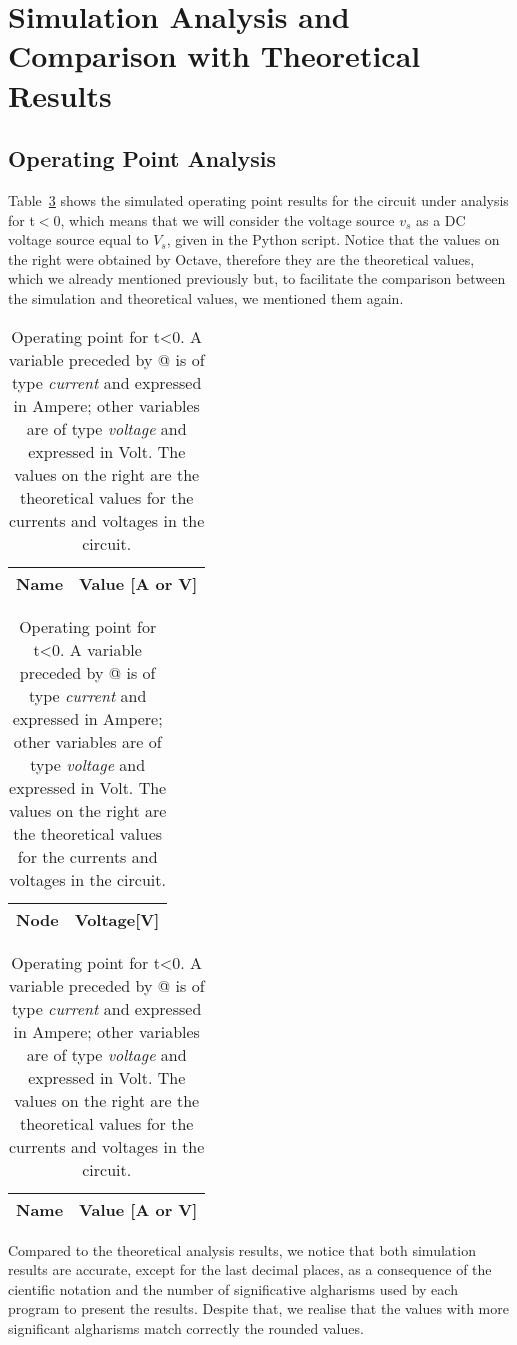 \section{Simulation Analysis and Comparison with Theoretical Results}
\label{sec:simulation}

\subsection{Operating Point Analysis}

	Table~\ref{tab1:op} shows the simulated operating point results for the circuit
under analysis for t$<$0, which means that we will consider the voltage source $v_s$ as a 
DC voltage source equal to $V_s$, given in the Python script. Notice that the values on the right
were obtained by Octave, therefore they are the theoretical values, which we already mentioned previously 
but, to facilitate the comparison between the simulation and theoretical values, we mentioned them again.

\begin{table}[H]
  \centering
  \begin{tabular}{|l|r|}
    \hline    
    {\bf Name} & {\bf Value [A or V]} \\ \hline
    
  \end{tabular}
  \begin{tabular}{|l|r|}
    \hline    
    {\bf Node} & {\bf Voltage[V]} \\ \hline
    
  \end{tabular}
  \begin{tabular}{|l|r|}
    \hline    
    {\bf Name} & {\bf Value [A or V]} \\ \hline
    
  \end{tabular}
  \caption {Operating point for t<0. A variable preceded by @ is of type {\em current}
    and expressed in Ampere; other variables are of type {\it voltage} and expressed in
    Volt. The values on the right are the theoretical values for the currents and voltages in the circuit.}
  \label{tab1:op}
\end{table}


	Compared to the theoretical analysis results, we notice that both simulation results are accurate, except for the last 
decimal places, as a consequence of the cientific notation and the number of significative algharisms used by each program to 
present the results. Despite that, we realise that the values with more significant algharisms match correctly the rounded values.


